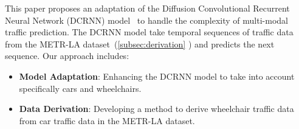 This paper proposes an adaptation of the Diffusion Convolutional Recurrent Neural Network (DCRNN) model~\cite{DCRNN}
to handle the complexity of multi-modal traffic prediction.
The DCRNN model take temporal sequences of traffic data from the METR-LA dataset~(\ref{subsec:derivation}
) and predicts the next sequence.
Our approach includes:
\begin{itemize}
    \item \textbf{Model Adaptation}:
    Enhancing the DCRNN model to take into account specifically cars and wheelchairs.
    \item \textbf{Data Derivation}:
    Developing a method to derive wheelchair traffic data from car traffic data in the METR-LA dataset.
\end{itemize}
\vspace{1em}
